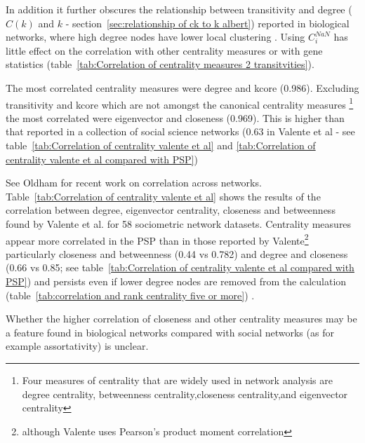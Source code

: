 In addition it further obscures the relationship between transitivity and degree ($C(k)$ and $k$ - section~\ref{sec:relationship of ck to k albert}) reported in biological networks, where high degree nodes have lower local clustering
\cite{albert2005scale}. Using $C_i^{NaN}$ has little effect on the correlation with other centrality measures or with gene statistics (table~\ref{tab:Correlation of centrality measures 2 transitvities}). 


The most correlated centrality measures were degree and kcore (0.986). Excluding transitivity and kcore which are not amongst the canonical centrality measures \cite{okamoto2008ranking}\footnote{Four measures of centrality that are widely used in network analysis are degree centrality, betweenness centrality,closeness centrality,and eigenvector centrality } the most correlated were eigenvector and closeness (0.969). This is higher than that reported in a collection of social science networks (0.63 in Valente et al\cite{valente2008correlated} - see table~\ref{tab:Correlation of centrality valente et al} and \ref{tab:Correlation of centrality valente et al compared with PSP}) 

See Oldham\cite{oldham2019consistency} for recent work on correlation across networks. Table~\ref{tab:Correlation of centrality valente et al} shows the results of the correlation between degree, eigenvector centrality, closeness and betweenness found by Valente et al.\cite{valente2008correlated} for 58 sociometric network datasets. Centrality measures appear more correlated in the PSP than in those reported by Valente\footnote{although Valente\cite{valente2008correlated} uses Pearson's product moment correlation} particularly closeness and betweenness (0.44 vs 0.782) and degree and closeness (0.66 vs 0.85; see table~\ref{tab:Correlation of centrality valente et al compared with PSP}) and persists even if lower degree nodes are removed from the calculation (table~\ref{tab:correlation and rank centrality five or more}) .

Whether the higher correlation of closeness and other centrality measures may be a feature found in biological networks compared with social networks (as for example assortativity) is unclear.

